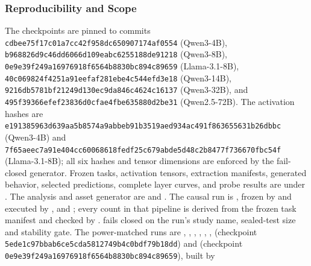\subsubsection{Reproducibility and Scope}
The checkpoints are pinned to commits
\texttt{cdbee75f17c01a7cc42f958dc650907174af0554} (Qwen3-4B),
\texttt{b968826d9c46dd6066d109eabc6255188de91218} (Qwen3-8B),
\texttt{0e9e39f249a16976918f6564b8830bc894c89659} (Llama-3.1-8B),
\texttt{40c069824f4251a91eefaf281ebe4c544efd3e18} (Qwen3-14B),
\texttt{9216db5781bf21249d130ec9da846c4624c16137} (Qwen3-32B), and
\texttt{495f39366efef23836d0cfae4fbe635880d2be31} (Qwen2.5-72B).
The activation hashes are
\texttt{e1913859\allowbreak{}63d639aa\allowbreak{}5b8574a9\allowbreak{}abbeb91b\allowbreak{}3519aed9\allowbreak{}34ac491f\allowbreak{}86365563\allowbreak{}1b26dbbc}
(Qwen3-4B) and
\texttt{7f65aeec\allowbreak{}7a91e404\allowbreak{}cc600686\allowbreak{}18fedf25\allowbreak{}c679abde\allowbreak{}5d48c2b8\allowbreak{}477f7366\allowbreak{}70fbc54f}
(Llama-3.1-8B); all six hashes and tensor dimensions are enforced by the
fail-closed generator. Frozen tasks, activation tensors, extraction manifests,
generated behavior, selected predictions, complete layer curves, and probe
results are under
.
The analysis and asset generator are
 and
. The causal run is
, frozen by
 and executed by
, 
and ; every count in that pipeline is
derived from the frozen task manifest and checked by
.
 fails closed on the run's
study name, sealed-test size and stability gate. The power-matched runs are
,
,
,
,
,
,
 (checkpoint
\texttt{5ede1c97bbab6ce5cda5812749b4c0bdf79b18dd}) and
 (checkpoint
\texttt{0e9e39f249a16976918f6564b8830bc894c89659}), built by
